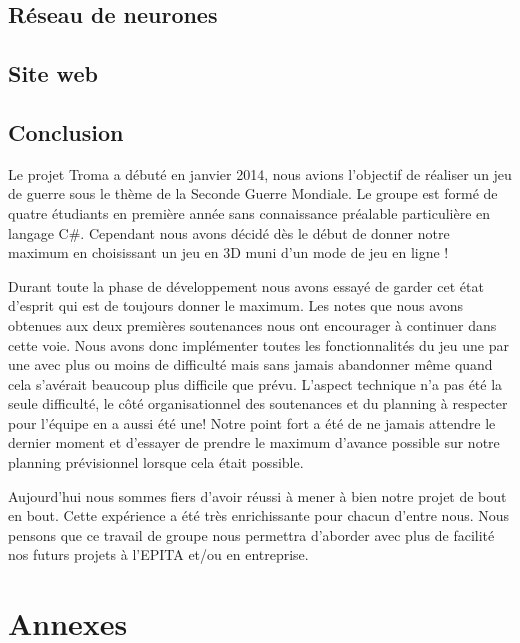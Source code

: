 \documentclass[11pt]{report}
\begin{document}
\chapter{Réseau de neurones}

\chapter{Site web}

\chapter{Conclusion}

Le projet Troma a débuté en janvier 2014, nous avions l'objectif de réaliser un jeu de guerre sous le thème de la Seconde Guerre Mondiale. Le groupe est formé de quatre étudiants en première année sans connaissance préalable particulière en langage C\#. Cependant nous avons décidé dès le début de donner notre maximum en choisissant un jeu en 3D muni d'un mode de jeu en ligne ! 

Durant toute la phase de développement nous avons essayé de garder cet état d'esprit qui est de toujours donner le maximum. Les notes que nous avons obtenues aux deux premières soutenances nous ont encourager à continuer dans cette voie. Nous avons donc implémenter toutes les fonctionnalités du jeu une par une avec plus ou moins de difficulté mais sans jamais abandonner même quand cela s'avérait beaucoup plus difficile que prévu. L'aspect technique n'a pas été la seule difficulté, le côté organisationnel des soutenances et du planning à respecter pour l'équipe en a aussi été une! Notre point fort a été de ne jamais attendre le dernier moment et d'essayer de prendre le maximum d'avance possible sur notre planning prévisionnel lorsque cela était possible.

Aujourd'hui nous sommes fiers d'avoir réussi à mener à bien notre projet de bout en bout. Cette expérience a été très enrichissante pour chacun d'entre nous. Nous pensons que ce travail de groupe nous permettra d'aborder avec plus de facilité nos futurs projets à l'EPITA et/ou en entreprise.

\newpage
{}
\part*{Annexes}

\newpage
\listoffigures

\newpage
\tableofcontents
 
\end{document}

